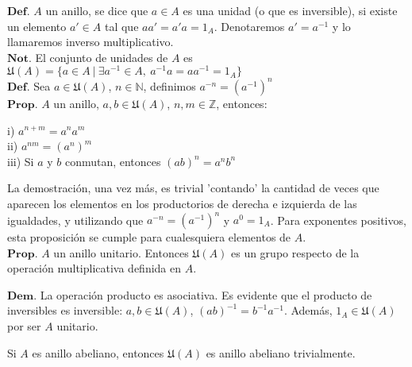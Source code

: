 \documentclass{article}
\begin{document}
$\textbf{Def.}$ $A$ un anillo, se dice que $a \in A$ es una unidad (o que es inversible), si existe un elemento $a' \in A$ tal que $aa' = a'a = 1_A$. Denotaremos $a' = a^{-1}$ y lo llamaremos inverso multiplicativo.\\

$\textbf{Not.}$ El conjunto de unidades de $A$ es $\mathfrak{U}(A) = \{a \in A \ | \ \exists a^{-1}\in A, \ a^{-1}a = aa^{-1} = 1_A\}$\\

$\textbf{Def.}$ Sea $a\in \mathfrak{U}(A)$, $n \in \mathbb{N}$, definimos $a^{-n} = (a^{-1})^n$\\



$\textbf{Prop.}$ $A$ un anillo, $a,b \in \mathfrak{U}(A)$, $n,m \in \mathbb{Z}$, entonces:
\begin{adjustwidth}{0.5cm}{}
    i) $a^{n + m} = a^na^m$\\
    ii) $a^{nm} = (a^n)^m$\\
    iii) Si $a$ y $b$ conmutan, entonces $(ab)^n = a^nb^n$
\end{adjustwidth}
La demostración, una vez más, es trivial 'contando' la cantidad de veces que aparecen los elementos en los productorios de derecha e izquierda de las igualdades, y utilizando que $a^{-n} = (a^{-1})^n$ y $a^{0} = 1_A$. Para exponentes positivos, esta proposición se cumple para cualesquiera elementos de $A$.\\

$\textbf{Prop.}$ $A$ un anillo unitario. Entonces $\mathfrak{U}(A)$ es un grupo respecto de la operación multiplicativa definida en $A$.
\begin{adjustwidth}{1cm}{}
    $\textbf{Dem.}$ La operación producto es asociativa. Es evidente que el producto de inversibles es inversible: $a,b \in \mathfrak{U}(A)$, $(ab)^{-1} = b^{-1}a^{-1}$. Además, $1_A \in \mathfrak{U}(A)$ por ser $A$ unitario.\\
\end{adjustwidth}
Si $A$ es anillo abeliano, entonces $\mathfrak{U}(A)$ es anillo abeliano trivialmente.\\
\end{document}
